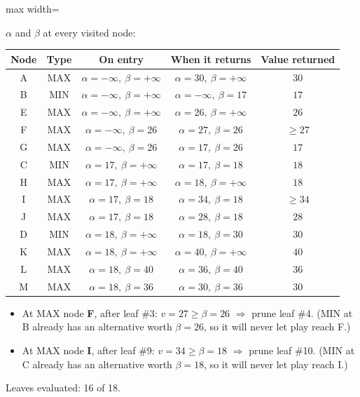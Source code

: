 \documentclass[11pt,a4paper]{article}
\begin{document}
\begin{solbox}
\begin{center}
\begin{adjustbox}{max width=\linewidth}
\end{adjustbox}
\end{center}$\alpha$ and $\beta$ at every visited node:\begin{center}\small\begin{tabular}{c c c c c}\toprule Node & Type & On entry & When it returns & Value returned\\\midrule A & MAX & $\alpha=-\infty,\ \beta=+\infty$ & $\alpha=30,\ \beta=+\infty$ & $30$ \\
B & MIN & $\alpha=-\infty,\ \beta=+\infty$ & $\alpha=-\infty,\ \beta=17$ & $17$ \\
E & MAX & $\alpha=-\infty,\ \beta=+\infty$ & $\alpha=26,\ \beta=+\infty$ & $26$ \\
F & MAX & $\alpha=-\infty,\ \beta=26$ & $\alpha=27,\ \beta=26$ & $\ge 27$ \\
G & MAX & $\alpha=-\infty,\ \beta=26$ & $\alpha=17,\ \beta=26$ & $17$ \\
C & MIN & $\alpha=17,\ \beta=+\infty$ & $\alpha=17,\ \beta=18$ & $18$ \\
H & MAX & $\alpha=17,\ \beta=+\infty$ & $\alpha=18,\ \beta=+\infty$ & $18$ \\
I & MAX & $\alpha=17,\ \beta=18$ & $\alpha=34,\ \beta=18$ & $\ge 34$ \\
J & MAX & $\alpha=17,\ \beta=18$ & $\alpha=28,\ \beta=18$ & $28$ \\
D & MIN & $\alpha=18,\ \beta=+\infty$ & $\alpha=18,\ \beta=30$ & $30$ \\
K & MAX & $\alpha=18,\ \beta=+\infty$ & $\alpha=40,\ \beta=+\infty$ & $40$ \\
L & MAX & $\alpha=18,\ \beta=40$ & $\alpha=36,\ \beta=40$ & $36$ \\
M & MAX & $\alpha=18,\ \beta=36$ & $\alpha=30,\ \beta=36$ & $30$ \\\bottomrule\end{tabular}\end{center}\begin{itemize}[leftmargin=1.5em,itemsep=1pt]
\item At MAX node \textbf{F}, after leaf \#3: $v=27 \ge \beta=26$ $\Rightarrow$ prune leaf \#4. (MIN at B already has an alternative worth $\beta=26$, so it will never let play reach F.)
\item At MAX node \textbf{I}, after leaf \#9: $v=34 \ge \beta=18$ $\Rightarrow$ prune leaf \#10. (MIN at C already has an alternative worth $\beta=18$, so it will never let play reach I.)
\end{itemize}Leaves evaluated: 16 of 18.
\end{solbox}
\end{document}
